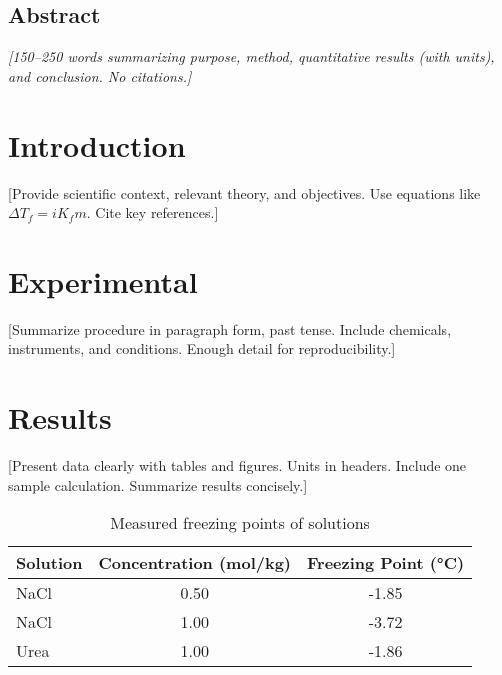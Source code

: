 \documentclass[11pt,letterpaper]{article}
\begin{document}
\MakeChemReportCoverPage

\begin{center}
\section*{\centering Abstract}
\begin{adjustwidth}{1.5cm}{1.5cm}
\textit{[150–250 words summarizing purpose, method, quantitative results (with units), and conclusion. No citations.]}
\end{adjustwidth}
\end{center}

\section*{Introduction}
[Provide scientific context, relevant theory, and objectives. Use equations like $\Delta T_f = iK_f m$. Cite key references.\cite{ref1}]

\section*{Experimental}
[Summarize procedure in paragraph form, past tense. Include chemicals, instruments, and conditions. Enough detail for reproducibility.]

\section*{Results}
[Present data clearly with tables and figures. Units in headers. Include one sample calculation. Summarize results concisely.]

\begin{table}[h]
\centering
\caption{Measured freezing points of solutions}
\begin{tabular}{lcc}
\hline
Solution & Concentration (mol/kg) & Freezing Point (°C) \\
\hline
NaCl     & 0.50                   & -1.85 \\
NaCl     & 1.00                   & -3.72 \\
Urea     & 1.00                   & -1.86 \\
\hline
\end{tabular}
\end{table}
\end{document}
